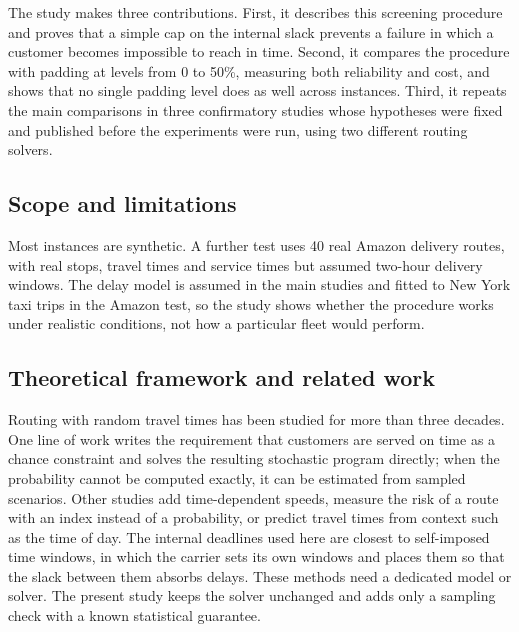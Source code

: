\documentclass[12pt,letterpaper]{article}
\newcommand{\AmzRoutes}{40}
\begin{document}
The study makes three contributions. First, it describes this screening procedure
and proves that a simple cap on the internal slack prevents a failure in which a
customer becomes impossible to reach in time. Second, it compares the procedure
with padding at levels from 0 to 50\%, measuring both reliability and cost, and
shows that no single padding level does as well across instances. Third, it
repeats the main comparisons in three confirmatory studies whose hypotheses were
fixed and published before the experiments were run, using two different routing
solvers.

\subsection{Scope and limitations}

Most instances are synthetic. A further test uses \AmzRoutes{} real Amazon delivery routes,
with real stops, travel times and service times but assumed two-hour delivery
windows. The delay model is assumed in the main studies and fitted to New York taxi trips
in the Amazon test, so the study shows whether the procedure works under
realistic conditions, not how a particular fleet would perform.

\subsection{Theoretical framework and related work}

Routing with random travel times has been studied for more than three
decades\cite{laporte1992,gendreau1996,kenyon2003}. One line of work writes the
requirement that customers are served on time as a chance constraint and solves the
resulting stochastic program directly\cite{li2010,ehmke2015}; when the probability
cannot be computed exactly, it can be estimated from sampled
scenarios\cite{ahmed2008}. Other studies add time-dependent
speeds\cite{tas2014,bomboi2022}, measure the risk of a route with an index instead
of a probability\cite{jaillet2016,zhang2019}, or predict travel times from context
such as the time of day\cite{serrano2026}. The internal deadlines used here are
closest to self-imposed time windows, in which the carrier sets its own windows and
places them so that the slack between them absorbs delays\cite{jabali2015,vareias2019}.
These methods need a dedicated model or solver. The present study keeps the solver
unchanged and adds only a sampling check with a known statistical
guarantee\cite{wilson1927,brown2001}.
\end{document}
